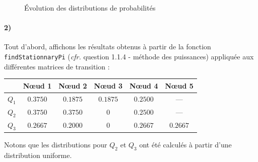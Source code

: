 \documentclass[a4paper,titlepage]{report}
\begin{document}
\begin{figure}[h]
	\caption{Évolution des distributions de probabilités}
	\label{fig:q118}
\end{figure}

\paragraph{2)} Tout d'abord, affichons les résultats obtenus à partir de la fonction \texttt{findStationnaryPi} (\textit{cfr.} question 1.1.4 - méthode des puissances) appliquée aux différentes matrices de transition : 
\begin{center}
	\begin{tabular}{c|ccccc}
		& Nœud 1 & Nœud 2 & Nœud 3 & Nœud 4 & Nœud 5\\
		\hline
		$Q_1$ & $0.3750$ & $0.1875$ & $0.1875$ & $0.2500$ & ---\\
		$Q_2$ & $0.3750$ & $0.3750$ & $0$ & $0.2500$ & ---\\
		$Q_3$ & $0.2667$ & $0.2000$ & $0$ & $0.2667$ & $0.2667$\\  
	\end{tabular}
\end{center}
Notons que les distributions pour $Q_2$ et $Q_3$ ont été calculés à partir d'une distribution uniforme.
\end{document}
